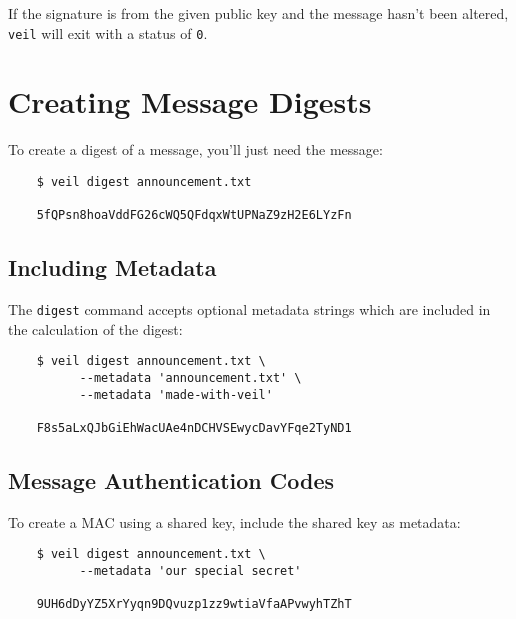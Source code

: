 \documentclass{scrartcl}
\begin{document}
    If the signature is from the given public key and the message hasn't been altered, \texttt{veil} will exit with a
    status of \texttt{0}\@.


    \section{Creating Message Digests}\label{sec:creating-message-digests}

    To create a digest of a message, you'll just need the message:

    \begin{verbatim}
    $ veil digest announcement.txt

    5fQPsn8hoaVddFG26cWQ5QFdqxWtUPNaZ9zH2E6LYzFn
    \end{verbatim}

    \subsection{Including Metadata}\label{subsec:including-metadata}

    The \texttt{digest} command accepts optional metadata strings which are included in the calculation of the digest:

    \begin{verbatim}
    $ veil digest announcement.txt \
          --metadata 'announcement.txt' \
          --metadata 'made-with-veil'

    F8s5aLxQJbGiEhWacUAe4nDCHVSEwycDavYFqe2TyND1
    \end{verbatim}

    \subsection{Message Authentication Codes}\label{subsec:message-authentication-codes}

    To create a MAC using a shared key, include the shared key as metadata:

    \begin{verbatim}
    $ veil digest announcement.txt \
          --metadata 'our special secret'

    9UH6dDyYZ5XrYyqn9DQvuzp1zz9wtiaVfaAPvwyhTZhT
    \end{verbatim}
\end{document}
